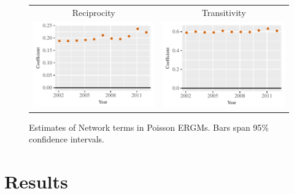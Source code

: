\documentclass[reqno,onecolumn,letterpaper,12pt]{article}
\begin{document}
\begin{figure}[htp]
\centering
\begin{tabular}{c@{\hskip -.4cm}c}
Reciprocity &
Transitivity\\
\includegraphics[height=.2\textheight, clip=true, trim=0cm .5cm 0cm .1cm]{draft_figures/rl_plots/Mutuality.pdf}    &
\includegraphics[height=.2\textheight, clip=true, trim=.5cm .5cm 0cm .1cm]{draft_figures/rl_plots/Transitivity.pdf}   \\
\end{tabular}
\caption{\label{fig:effectPlots4} Estimates of Network terms in Poisson ERGMs. Bars span 95\% confidence intervals.}
\end{figure}



\section{Results}
\end{document}
